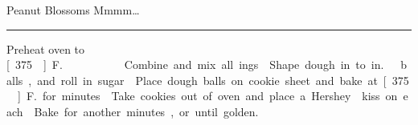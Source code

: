 \begin{recipe}{Peanut Blossoms}{}{}
\freeform Mmmm\ldots\\
\rule{\textwidth}{0.05pt}
\newstep Preheat oven to \unit[375\0]{F.}.
Combine and mix all ings.
\newstep Shape dough in to \unit[1]{in.}\ balls, and roll in sugar.
\newstep Place dough balls on cookie sheet and bake at \unit[375\0]{F.} for \unit[7--8]{minutes}.
Take cookies out of oven and place a Hershey\tm{} kiss on each.
\newstep Bake for another \unit[2--5]{minutes}, or until golden.
\end{recipe}
